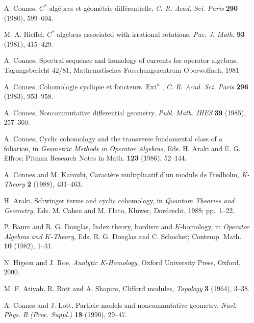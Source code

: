 \documentclass[a4paper,12pt]{article}
\newcommand{\1}{\mathbf{1}}         %
\newcommand{\7}{\dagger}            %
\newcommand{\8}{\bullet}            %
\renewcommand{\.}{\cdot}            %
\renewcommand{\:}{\colon}           %
\begin{document}
\begin{thebibliography}{74}

\def\topsep{0pt}
\def\parsep{0pt plus 5pt minus 1pt}
\def\itemsep{-0.5ex}
\small

A. Connes,
$C^*$-alg\`ebres et g\'eom\'etrie diff\'erentielle,
\textit{C. R. Acad. Sci. Paris} {\bf 290} (1980), 599--604.

M. A. Rieffel,
$C^*$-algebras associated with irrational rotations,
\textit{Pac. J. Math}. {\bf 93} (1981), 415--429.

A. Connes,
Spectral sequence and homology of currents for operator algebras,
Tagungsbericht 42/81,
Mathematisches Forschungszentrum Oberwolfach, 1981.

A. Connes,
Cohomologie cyclique et foncteurs $\operatorname{Ext}^n$,
\textit{C. R. Acad. Sci. Paris} {\bf 296} (1983), 953--958.

A. Connes,
Noncommutative differential geometry,
\textit{Publ. Math. IHES} {\bf 39} (1985), 257--360.

A. Connes,
Cyclic cohomology and the transverse fundamental class of a
foliation,
in \textit{Geometric Methods in Operator Algebras},
Eds. H. Araki and E. G. Effros;
Pitman Research Notes in Math. {\bf 123} (1986), 52--144.

A. Connes and M. Karoubi,
Caract\`ere multiplicatif d'un module de Fredholm,
\textit{K-Theory} {\bf 2} (1988), 431--463.

H. Araki,
Schwinger terms and cyclic cohomology,
in \textit{Quantum Theories and Geometry},
Eds. M. Cahen and M. Flato,
Kluwer, Dordrecht, 1988; pp.~1--22.

P. Baum and R. G. Douglas,
Index theory, bordism and $K$-homology,
in \textit{Operator Algebras and $K$-Theory},
Eds. R. G. Douglas and C. Schochet;
Contemp. Math. {\bf 10} (1982), 1--31.

N. Higson and J. Roe,
\textit{Analytic K-Homology},
Oxford University Press, Oxford, 2000.

M. F. Atiyah, R. Bott and A. Shapiro,
Clifford modules,
\textit{Topology} {\bf 3} (1964), 3--38.

A. Connes and J. Lott,
Particle models and noncommutative geometry,
\textit{Nucl. Phys. B (Proc. Suppl.)} {\bf 18} (1990), 29--47.


\end{thebibliography}
\end{document}

